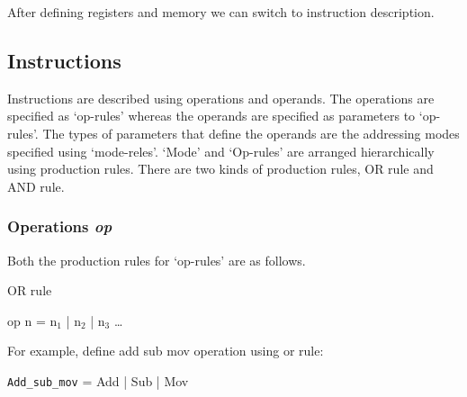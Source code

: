 \documentclass[oneside,final,12pt]{extreport}
\begin{document}
\bigskip

After defining registers and memory we can switch to instruction description.

\bigskip

\newpage

\subsection*{Instructions}

\bigskip

Instructions are described using operations and operands. The operations are specified as ‘op-rules’ whereas the operands are specified as parameters to ‘op-rules’.
 The types of parameters that define the operands are the addressing modes specified using ‘mode-reles’.
‘Mode’ and ‘Op-rules’ are arranged hierarchically using production rules. There are two kinds of production rules, OR rule and AND rule. 

\bigskip


\subsubsection*{Operations \itshape{op}}

\bigskip

Both the production rules for ‘op-rules’ are as follows. 

\bigskip
\itshape

\bfseries

OR rule

\mdseries

\upshape


\bigskip

op n = n$_1$ | n$_2$ | n$_3$ …

\bigskip

For example, define add sub mov operation using or rule:



 


\bigskip

\lstinline!Add_sub_mov! = Add | Sub | Mov

\bigskip
\bigskip
\itshape
\end{document}

